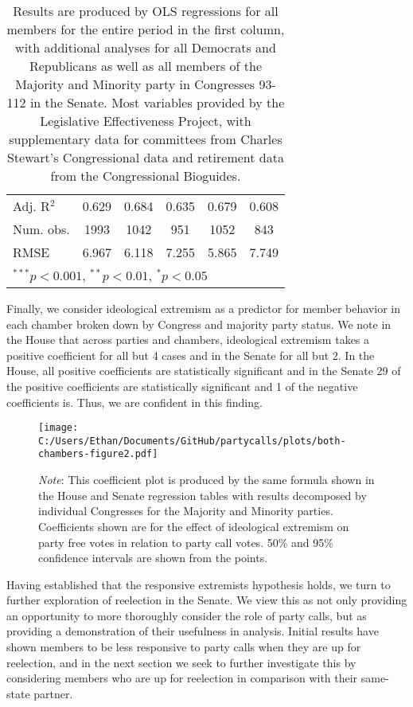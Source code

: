 \documentclass[12pt]{article}
\newcommand\fnote[1]{\captionsetup{font=small}\caption*{#1}}
\begin{document}
\begin{table}[H]
\begin{center}
\begin{tabular}{l c c c c c }
			Adj. R$^2$             & 0.629          & 0.684         & 0.635          & 0.679          & 0.608         \\
			Num. obs.              & 1993           & 1042          & 951            & 1052           & 843           \\
			RMSE                   & 6.967          & 6.118         & 7.255          & 5.865          & 7.749         \\
			\hline
			\multicolumn{6}{l}{\scriptsize{$^{***}p<0.001$, $^{**}p<0.01$, $^*p<0.05$}}
		\end{tabular}
		\fnote{Results are produced by OLS regressions for all members for the entire period in the first column, with additional analyses for all Democrats and Republicans as well as all members of the Majority and Minority party in Congresses 93-112 in the Senate. Most variables provided by the Legislative Effectiveness Project, with supplementary data for committees from Charles Stewart's Congressional data and retirement data from the Congressional Bioguides.}
	\end{center}
\end{table}

Finally, we consider ideological extremism as a predictor for member behavior in each chamber broken down by Congress and majority party status. We note in the House that across parties and chambers, ideological extremism takes a positive coefficient for all but 4 cases and in the Senate for all but 2. In the House, all positive coefficients are statistically significant and in the Senate 29 of the positive coefficients are statistically significant and 1 of the negative coefficients is. Thus, we are confident in this finding.

\begin{figure}[H]
	\centering
	\caption{Ideology and Responsiveness to Party Calls, Congresses 93-112}
	\texttt{[image: C:/Users/Ethan/Documents/GitHub/partycalls/plots/both-chambers-figure2.pdf]}
	\fnote{\textit{Note}: This coefficient plot is produced by the same formula shown in the House and Senate regression tables with results decomposed by individual Congresses for the Majority and Minority parties. Coefficients shown are for the effect of ideological extremism on party free votes in relation to party call votes. 50\% and 95\% confidence intervals are shown from the points.}
\end{figure} 

Having established that the responsive extremists hypothesis holds, we turn to further exploration of reelection in the Senate. We view this as not only providing an opportunity to more thoroughly consider the role of party calls, but as providing a demonstration of their usefulness in analysis. Initial results have shown members to be less responsive to party calls when they are up for reelection, and in the next section we seek to further investigate this by considering members who are up for reelection in comparison with their same-state partner. 
\end{document}
